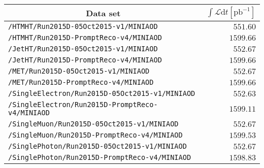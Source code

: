 \begin{center}
\begin{tabular}{lr}
\hline\hline
\multicolumn{1}{c}{Data set}&\multicolumn{1}{c}{$\int\mathcal{L}\textrm{d}t [\textrm{pb}^{-1}]$}\tabularnewline
\hline
\verb!/HTMHT/Run2015D-05Oct2015-v1/MINIAOD! &$ 551.60$\tabularnewline
\verb!/HTMHT/Run2015D-PromptReco-v4/MINIAOD! &$1599.66$\tabularnewline
\verb!/JetHT/Run2015D-05Oct2015-v1/MINIAOD! &$ 552.67$\tabularnewline
\verb!/JetHT/Run2015D-PromptReco-v4/MINIAOD! &$1599.66$\tabularnewline
\verb!/MET/Run2015D-05Oct2015-v1/MINIAOD! &$ 552.67$\tabularnewline
\verb!/MET/Run2015D-PromptReco-v4/MINIAOD! &$1599.66$\tabularnewline
\verb!/SingleElectron/Run2015D-05Oct2015-v1/MINIAOD! &$ 552.63$\tabularnewline
\verb!/SingleElectron/Run2015D-PromptReco-v4/MINIAOD! &$1599.11$\tabularnewline
\verb!/SingleMuon/Run2015D-05Oct2015-v1/MINIAOD! &$ 552.67$\tabularnewline
\verb!/SingleMuon/Run2015D-PromptReco-v4/MINIAOD! &$1599.53$\tabularnewline
\verb!/SinglePhoton/Run2015D-05Oct2015-v1/MINIAOD! &$ 552.67$\tabularnewline
\verb!/SinglePhoton/Run2015D-PromptReco-v4/MINIAOD! &$1598.83$\tabularnewline
\hline
\end{tabular}\end{center}
